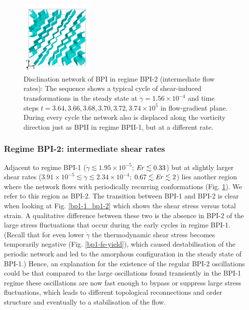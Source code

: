 \documentclass[8.5pt,twoside,twocolumn]{article}
\newcommand{\e}[1]{\times10^{#1}}
\newcommand{\gd}{\dot{\gamma}}
\begin{document}
\begin{figure}[htpb]
\includegraphics[width=0.32\textwidth]{disc-374k_run914r.png}
\caption{Disclination network of BPI in regime BPI-2 (intermediate flow rates): 
The sequence shows a typical cycle of shear-induced transformations in the 
steady state at $\gd=1.56\e{-4}$ and time steps 
$t=3.64, 3.66,3.68,3.70,3.72,3.74\e{5}$ in flow-gradient plane. 
During every cycle the network also is displaced 
along the vorticity direction just as BPII
in regime BPII-1, but at a different rate.
}
\label{bp1-2-disc}
\end{figure}

\subsubsection{Regime BPI-2: intermediate shear rates }

Adjacent to regime BPI-1 ($\gd\lesssim1.95\e{-5}$; $ {\it Er}\lesssim 0.33$) but 
at slightly larger shear rates ($3.91\e{-5}\lesssim\gd\lesssim 2.34\e{-4}$; $0.67\lesssim{\it Er}\lesssim2$)
lies another region where the network flows with periodically 
recurring conformations (Fig. \ref{bp1-2-disc}). 
We refer to this region as BPI-2. The transition between BPI-1 and BPI-2 
is clear when looking at Fig. \ref{bp1-1_bp1-2} 
which shows the shear stress versus total strain. 
A qualitative difference between these two is the absence in BPI-2 of the 
large stress fluctuations that occur during the early cycles in regime BPI-1.
(Recall that for even lower $\gd$ the thermodynamic shear stress becomes 
temporarily negative (Fig. \ref{bp1-fe-yield}), which 
caused destabilisation of the periodic network and led to the 
amorphous configuration in the steady state of BPI-1.)
Hence, an explanation
for the existence of the regular BPI-2 oscillations 
could be that compared to the large oscillations found transiently in
the BPI-1 regime these oscillations are now fast enough to bypass or suppress 
large stress fluctuations, which leads to
different topological reconnections and order structure
and eventually to a stabilisation of the flow. 
\end{document}
